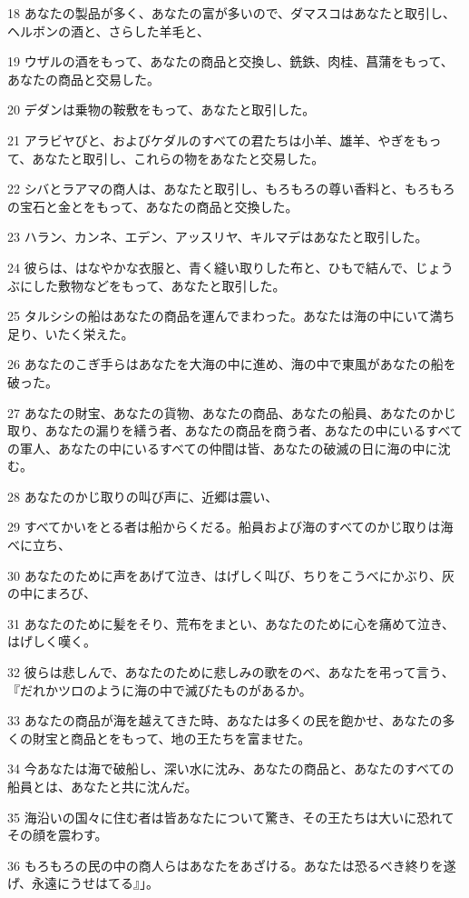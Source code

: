 \par 18 あなたの製品が多く、あなたの富が多いので、ダマスコはあなたと取引し、ヘルボンの酒と、さらした羊毛と、
\par 19 ウザルの酒をもって、あなたの商品と交換し、銑鉄、肉桂、菖蒲をもって、あなたの商品と交易した。
\par 20 デダンは乗物の鞍敷をもって、あなたと取引した。
\par 21 アラビヤびと、およびケダルのすべての君たちは小羊、雄羊、やぎをもって、あなたと取引し、これらの物をあなたと交易した。
\par 22 シバとラアマの商人は、あなたと取引し、もろもろの尊い香料と、もろもろの宝石と金とをもって、あなたの商品と交換した。
\par 23 ハラン、カンネ、エデン、アッスリヤ、キルマデはあなたと取引した。
\par 24 彼らは、はなやかな衣服と、青く縫い取りした布と、ひもで結んで、じょうぶにした敷物などをもって、あなたと取引した。
\par 25 タルシシの船はあなたの商品を運んでまわった。あなたは海の中にいて満ち足り、いたく栄えた。
\par 26 あなたのこぎ手らはあなたを大海の中に進め、海の中で東風があなたの船を破った。
\par 27 あなたの財宝、あなたの貨物、あなたの商品、あなたの船員、あなたのかじ取り、あなたの漏りを繕う者、あなたの商品を商う者、あなたの中にいるすべての軍人、あなたの中にいるすべての仲間は皆、あなたの破滅の日に海の中に沈む。
\par 28 あなたのかじ取りの叫び声に、近郷は震い、
\par 29 すべてかいをとる者は船からくだる。船員および海のすべてのかじ取りは海べに立ち、
\par 30 あなたのために声をあげて泣き、はげしく叫び、ちりをこうべにかぶり、灰の中にまろび、
\par 31 あなたのために髪をそり、荒布をまとい、あなたのために心を痛めて泣き、はげしく嘆く。
\par 32 彼らは悲しんで、あなたのために悲しみの歌をのべ、あなたを弔って言う、『だれかツロのように海の中で滅びたものがあるか。
\par 33 あなたの商品が海を越えてきた時、あなたは多くの民を飽かせ、あなたの多くの財宝と商品とをもって、地の王たちを富ませた。
\par 34 今あなたは海で破船し、深い水に沈み、あなたの商品と、あなたのすべての船員とは、あなたと共に沈んだ。
\par 35 海沿いの国々に住む者は皆あなたについて驚き、その王たちは大いに恐れてその顔を震わす。
\par 36 もろもろの民の中の商人らはあなたをあざける。あなたは恐るべき終りを遂げ、永遠にうせはてる』」。

